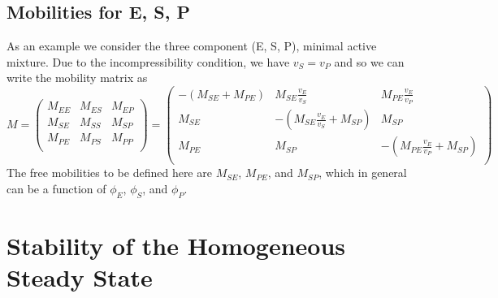 \subsection{Mobilities for E, S, P}
As an example we consider the three component (E, S, P), minimal active mixture. Due to the incompressibility condition, we have $v_S=v_P$ and so we can write the mobility matrix as
\begin{equation}
M = 
\begin{pmatrix}
M_{EE} & M_{ES} & M_{EP}\\
M_{SE} & M_{SS} & M_{SP}\\
M_{PE} & M_{PS} & M_{PP}\\
\end{pmatrix}
=
\begin{pmatrix}
-(M_{SE}+M_{PE}) & M_{SE}\frac{v_E}{v_S} & M_{PE}\frac{v_E}{v_P}\\
M_{SE} & -(M_{SE}\frac{v_E}{v_S}+M_{SP}) & M_{SP}\\
M_{PE} & M_{SP} & -(M_{PE}\frac{v_E}{v_P}+M_{SP})\\
\end{pmatrix}
\label{ESP_mob}
\end{equation}
The free mobilities to be defined here are $M_{SE}$, $M_{PE}$, and $M_{SP}$, which in general can be a function of $\phi_E$, $\phi_S$, and $\phi_P$.

\section{Stability of the Homogeneous Steady State}
